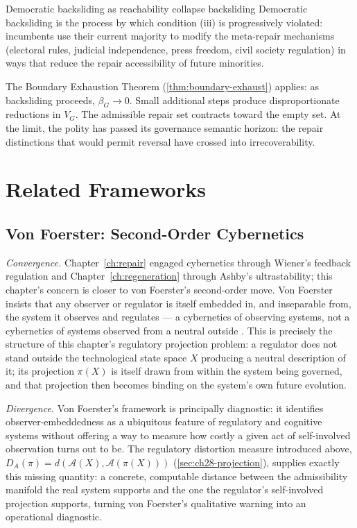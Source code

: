 \documentclass[12pt,twoside,openright]{book}
\newcommand{\adm}{\mathcal{A}}
\begin{document}
\begin{remark}{Democratic backsliding as reachability collapse}%
  {backsliding}
  Democratic backsliding is the process by which
  condition (iii) is progressively violated: incumbents
  use their current majority to modify the meta-repair
  mechanisms (electoral rules, judicial independence,
  press freedom, civil society regulation) in ways that
  reduce the repair accessibility of future minorities.

  The Boundary Exhaustion Theorem
  (\cref{thm:boundary-exhaust}) applies: as backsliding
  proceeds, $\beta_G \to 0$. Small additional steps
  produce disproportionate reductions in $V_G$. The
  admissible repair set contracts toward the empty set.
  At the limit, the polity has passed its governance
  semantic horizon: the repair distinctions that would
  permit reversal have crossed into irrecoverability.
\end{remark}

\section{Related Frameworks}
\label{sec:ch28-related-frameworks}

\subsection*{Von Foerster: Second-Order Cybernetics}

\emph{Convergence.} Chapter~\ref{ch:repair} engaged cybernetics
through Wiener's feedback regulation and
Chapter~\ref{ch:regeneration} through Ashby's ultrastability;
this chapter's concern is closer to von Foerster's second-order
move. Von Foerster insists that any observer or regulator is
itself embedded in, and inseparable from, the system it observes
and regulates --- a cybernetics of observing systems, not a
cybernetics of systems observed from a neutral outside
\parencite{foerster1960}. This is precisely the structure of this
chapter's regulatory projection problem: a regulator does not
stand outside the technological state space $X$ producing a
neutral description of it; its projection $\pi(X)$ is itself
drawn from within the system being governed, and that projection
then becomes binding on the system's own future evolution.

\emph{Divergence.} Von Foerster's framework is principally
diagnostic: it identifies observer-embeddedness as a ubiquitous
feature of regulatory and cognitive systems without offering a
way to measure how costly a given act of self-involved
observation turns out to be. The regulatory distortion measure
introduced above, $D_A(\pi) = d(\adm(X), \adm(\pi(X)))$
(\cref{sec:ch28-projection}), supplies exactly this missing
quantity: a concrete, computable distance between the
admissibility manifold the real system supports and the one the
regulator's self-involved projection supports, turning von
Foerster's qualitative warning into an operational diagnostic.
\end{document}
